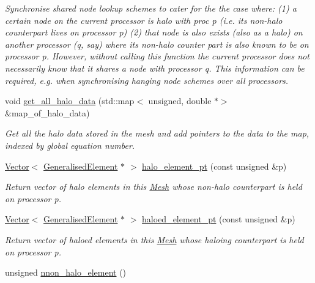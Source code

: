 \begin{DoxyCompactItemize}
\begin{DoxyCompactList}\small\item\em Synchronise shared node lookup schemes to cater for the the case where\+: (1) a certain node on the current processor is halo with proc p (i.\+e. its non-\/halo counterpart lives on processor p) (2) that node is also exists (also as a halo) on another processor (q, say) where its non-\/halo counter part is also known to be on processor p. However, without calling this function the current processor does not necessarily know that it shares a node with processor q. This information can be required, e.\+g. when synchronising hanging node schemes over all processors. \end{DoxyCompactList}\item 
void \hyperlink{classoomph_1_1Mesh_ae212c9c9be3a640552cf967b9583667c}{get\+\_\+all\+\_\+halo\+\_\+data} (std\+::map$<$ unsigned, double $\ast$$>$ \&map\+\_\+of\+\_\+halo\+\_\+data)
\begin{DoxyCompactList}\small\item\em Get all the halo data stored in the mesh and add pointers to the data to the map, indexed by global equation number. \end{DoxyCompactList}\item 
\hyperlink{classoomph_1_1Vector}{Vector}$<$ \hyperlink{classoomph_1_1GeneralisedElement}{Generalised\+Element} $\ast$ $>$ \hyperlink{classoomph_1_1Mesh_afe6eb606740b41ab503a7199a23ebc97}{halo\+\_\+element\+\_\+pt} (const unsigned \&p)
\begin{DoxyCompactList}\small\item\em Return vector of halo elements in this \hyperlink{classoomph_1_1Mesh}{Mesh} whose non-\/halo counterpart is held on processor p. \end{DoxyCompactList}\item 
\hyperlink{classoomph_1_1Vector}{Vector}$<$ \hyperlink{classoomph_1_1GeneralisedElement}{Generalised\+Element} $\ast$ $>$ \hyperlink{classoomph_1_1Mesh_a56fea37302ae55a16402a9add625ad97}{haloed\+\_\+element\+\_\+pt} (const unsigned \&p)
\begin{DoxyCompactList}\small\item\em Return vector of haloed elements in this \hyperlink{classoomph_1_1Mesh}{Mesh} whose haloing counterpart is held on processor p. \end{DoxyCompactList}\item 
unsigned \hyperlink{classoomph_1_1Mesh_a9e74e01173bbdf890d0ea1908b22b6ef}{nnon\+\_\+halo\+\_\+element} ()
$$
\end{DoxyCompactItemize}
